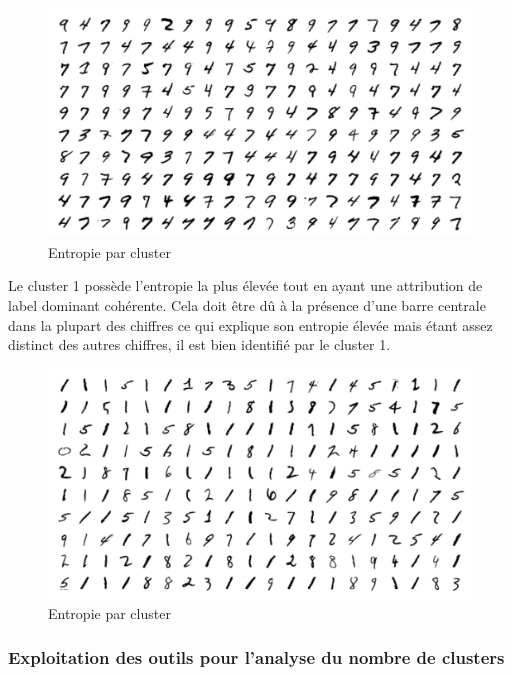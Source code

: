 \documentclass[french,a4paper,18pt]{article}
\begin{document}
\begin{figure}[h!]
    \centering
    \includegraphics[scale=0.3]{images/mnist_kmeans_confusion_high_entropy_cluster.png}
    \caption{Entropie par cluster}\label{fig:mnist_kmeans_entropy}
\end{figure}

Le cluster 1 possède l'entropie la plus élevée tout en ayant une attribution de label dominant cohérente.
Cela doit être dû à la présence d'une barre centrale dans la plupart des chiffres ce qui explique 
son entropie élevée mais étant assez distinct des autres chiffres, il est bien identifié par le cluster 1.

\begin{figure}[h!]
    \centering
    \includegraphics[scale=0.3]{images/mnist_kmeans_high_entropy_cluster.png}
    \caption{Entropie par cluster}\label{fig:mnist_kmeans_entropy}
\end{figure}

\subsubsection{Exploitation des outils pour l'analyse du nombre de clusters}
\end{document}
